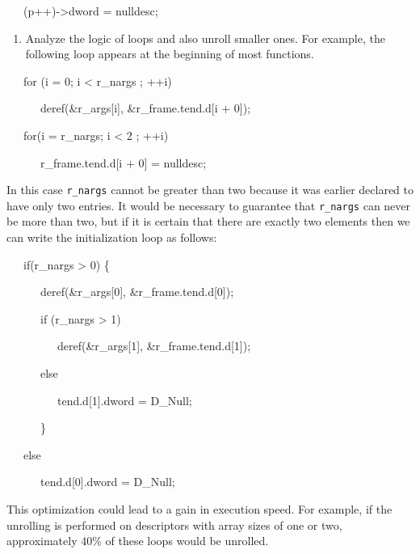 {\ttfamily\mdseries
\ \ \ (p++)-{\textgreater}dword = nulldesc;}

\liststyleLxxxvii
\begin{enumerate}
\item 
Analyze the logic of loops and also unroll smaller ones. For example,
the following loop appears at the beginning of most functions.
\end{enumerate}
{\ttfamily\mdseries
\ \ \ for (i = 0; i {\textless} r\_nargs ; ++i)}

{\ttfamily\mdseries
\ \ \ \ \ \ deref(\&r\_args[i], \&r\_frame.tend.d[i + 0]);}

{\ttfamily\mdseries
\ \ \ for(i = r\_nargs; i {\textless} 2 ; ++i)}

{\ttfamily\mdseries
\ \ \ \ \ \ r\_frame.tend.d[i + 0] = nulldesc;}


In this case \texttt{r\_nargs} cannot be greater than two because it
was earlier declared to have only two entries. It would be necessary
to guarantee that \texttt{r\_nargs} can never be more than two, but if
it is certain that there are exactly two elements then we can write
the initialization loop as follows:

{\ttfamily\mdseries
\ \ \ if(r\_nargs {\textgreater} 0) \{}

{\ttfamily\mdseries
\ \ \ \ \ \ deref(\&r\_args[0], \&r\_frame.tend.d[0]);}

{\ttfamily\mdseries
\ \ \ \ \ \ if (r\_nargs {\textgreater} 1)}

{\ttfamily\mdseries
\ \ \ \ \ \ \ \ \ deref(\&r\_args[1], \&r\_frame.tend.d[1]);}

{\ttfamily\mdseries
\ \ \ \ \ \ else}

{\ttfamily\mdseries
\ \ \ \ \ \ \ \ \ tend.d[1].dword = D\_Null;}

{\ttfamily\mdseries
\ \ \ \ \ \ \}}

{\ttfamily\mdseries
\ \ \ else}

{\ttfamily\mdseries
\ \ \ \ \ \ tend.d[0].dword = D\_Null;}


This optimization could lead to a gain in execution speed. For
example, if the unrolling is performed on descriptors with array sizes
of one or two, approximately 40\% of these loops would be unrolled.

